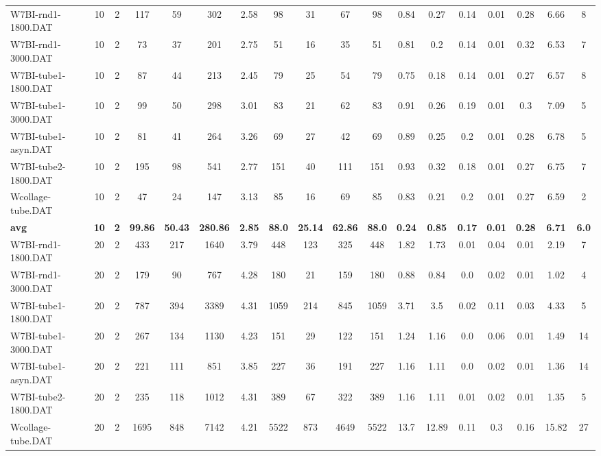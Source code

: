 \begin{sidewaystable}[h]
{\begin{tabular}{lccccccccccccccccc}
W7BI-rnd1-1800.DAT & 10 & 2 & 117 & 59 & 302 & 2.58 & 98 & 31 & 67 & 98 & 0.84 & 0.27 & 0.14 & 0.01 & 0.28 & 6.66 & 8\\
W7BI-rnd1-3000.DAT & 10 & 2 & 73 & 37 & 201 & 2.75 & 51 & 16 & 35 & 51 & 0.81 & 0.2 & 0.14 & 0.01 & 0.32 & 6.53 & 7\\
W7BI-tube1-1800.DAT & 10 & 2 & 87 & 44 & 213 & 2.45 & 79 & 25 & 54 & 79 & 0.75 & 0.18 & 0.14 & 0.01 & 0.27 & 6.57 & 8\\
W7BI-tube1-3000.DAT & 10 & 2 & 99 & 50 & 298 & 3.01 & 83 & 21 & 62 & 83 & 0.91 & 0.26 & 0.19 & 0.01 & 0.3 & 7.09 & 5\\
W7BI-tube1-asyn.DAT & 10 & 2 & 81 & 41 & 264 & 3.26 & 69 & 27 & 42 & 69 & 0.89 & 0.25 & 0.2 & 0.01 & 0.28 & 6.78 & 5\\
W7BI-tube2-1800.DAT & 10 & 2 & 195 & 98 & 541 & 2.77 & 151 & 40 & 111 & 151 & 0.93 & 0.32 & 0.18 & 0.01 & 0.27 & 6.75 & 7\\
Wcollage-tube.DAT & 10 & 2 & 47 & 24 & 147 & 3.13 & 85 & 16 & 69 & 85 & 0.83 & 0.21 & 0.2 & 0.01 & 0.27 & 6.59 & 2\\
\cline{1-18} \textbf{avg} & \textbf{10} & \textbf{2} & \textbf{99.86} & \textbf{50.43} & \textbf{280.86} & \textbf{2.85} & \textbf{88.0} & \textbf{25.14} & \textbf{62.86} & \textbf{88.0} & \textbf{0.24} & \textbf{0.85} & \textbf{0.17} & \textbf{0.01} & \textbf{0.28} & \textbf{6.71} & \textbf{6.0} \\ \cline{1-18}
W7BI-rnd1-1800.DAT & 20 & 2 & 433 & 217 & 1640 & 3.79 & 448 & 123 & 325 & 448 & 1.82 & 1.73 & 0.01 & 0.04 & 0.01 & 2.19 & 7\\
W7BI-rnd1-3000.DAT & 20 & 2 & 179 & 90 & 767 & 4.28 & 180 & 21 & 159 & 180 & 0.88 & 0.84 & 0.0 & 0.02 & 0.01 & 1.02 & 4\\
W7BI-tube1-1800.DAT & 20 & 2 & 787 & 394 & 3389 & 4.31 & 1059 & 214 & 845 & 1059 & 3.71 & 3.5 & 0.02 & 0.11 & 0.03 & 4.33 & 5\\
W7BI-tube1-3000.DAT & 20 & 2 & 267 & 134 & 1130 & 4.23 & 151 & 29 & 122 & 151 & 1.24 & 1.16 & 0.0 & 0.06 & 0.01 & 1.49 & 14\\
W7BI-tube1-asyn.DAT & 20 & 2 & 221 & 111 & 851 & 3.85 & 227 & 36 & 191 & 227 & 1.16 & 1.11 & 0.0 & 0.02 & 0.01 & 1.36 & 14\\
W7BI-tube2-1800.DAT & 20 & 2 & 235 & 118 & 1012 & 4.31 & 389 & 67 & 322 & 389 & 1.16 & 1.11 & 0.01 & 0.02 & 0.01 & 1.35 & 5\\
Wcollage-tube.DAT & 20 & 2 & 1695 & 848 & 7142 & 4.21 & 5522 & 873 & 4649 & 5522 & 13.7 & 12.89 & 0.11 & 0.3 & 0.16 & 15.82 & 27\\

\end{tabular}}
\end{sidewaystable}
